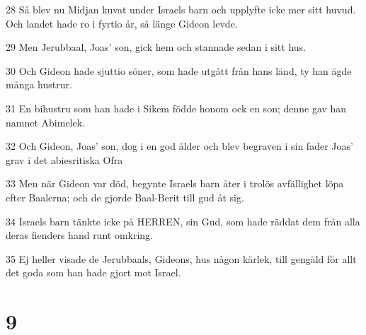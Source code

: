 \par 28 Så blev nu Midjan kuvat under Israels barn och upplyfte icke mer sitt huvud. Och landet hade ro i fyrtio år, så länge Gideon levde.
\par 29 Men Jerubbaal, Joas' son, gick hem och stannade sedan i sitt hus.
\par 30 Och Gideon hade sjuttio söner, som hade utgått från hans länd, ty han ägde många hustrur.
\par 31 En bihustru som han hade i Sikem födde honom ock en son; denne gav han namnet Abimelek.
\par 32 Och Gideon, Joas' son, dog i en god ålder och blev begraven i sin fader Joas' grav i det abiesritiska Ofra
\par 33 Men när Gideon var död, begynte Israels barn åter i trolös avfällighet löpa efter Baalerna; och de gjorde Baal-Berit till gud åt sig.
\par 34 Israels barn tänkte icke på HERREN, sin Gud, som hade räddat dem från alla deras fienders hand runt omkring.
\par 35 Ej heller visade de Jerubbaals, Gideons, hus någon kärlek, till gengäld för allt det goda som han hade gjort mot Israel.

\chapter{9}

